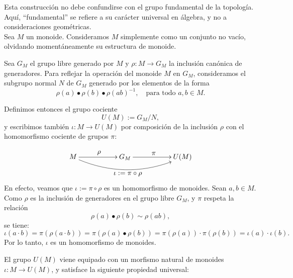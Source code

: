 \medskip
\noindent Esta construcción no debe confundirse con el grupo fundamental de la topología. Aquí, ``fundamental'' se refiere a su carácter universal en álgebra, y no a consideraciones geométricas.\\






  
  
  
  Sea \( M \) un monoide. Consideramos \( M \) simplemente como un conjunto no vacío, olvidando momentáneamente su estructura de monoide.
  
  \medskip
  
  \noindent Sea \( G_M \) el grupo libre generado por \( M \) y \( \rho : M \to G_M \) la inclusión canónica de generadores. Para reflejar la operación del monoide \( M \) en \( G_M \), consideramos el subgrupo normal \( N \) de \( G_M \) generado por los elementos de la forma
  \[
  \rho(a) \bullet \rho(b) \bullet \rho(ab)^{-1}, \quad \text{para todo } a, b \in M.
  \]
  
  \noindent Definimos entonces el grupo cociente
  \[
  U(M) := G_M / N,
  \]
  y escribimos también \( \iota : M \to U(M) \) por  composición de la inclusión $\rho$ con el homomorfismo cociente de grupos $\pi$: 
  
  
  \[
  \xymatrix{
  	M \ar[rr]^{\displaystyle\rho} \ar@/_1.5pc/[rrrr]_{\displaystyle \iota:=\pi \circ \rho} && G_M \ar[rr]^{\displaystyle \pi} && U(M)
  }
  \]
 \noindent En efecto, veamos que \( \iota := \pi \circ \rho \) es un homomorfismo de monoides. Sean \( a, b \in M \). Como \( \rho \) es la inclusión de generadores en el grupo libre \( G_M \), y \( \pi \) respeta la relación
 \[
 \rho(a) \bullet \rho(b) \sim \rho(ab),
 \]
 se tiene:
 \[
 \iota(a \cdot b) = \pi(\rho(a \cdot b)) = \pi(\rho(a) \bullet \rho(b)) = \pi(\rho(a)) \cdot \pi(\rho(b)) = \iota(a) \cdot \iota(b).
 \]
 Por lo tanto, \( \iota \) es un homomorfismo de monoides.
  
  
  \begin{definicion}
  \end{definicion}
  
  \noindent El grupo \( U(M) \) viene equipado con un morfismo natural de monoides \( \iota : M \to U(M) \), y satisface la siguiente propiedad universal:
  
